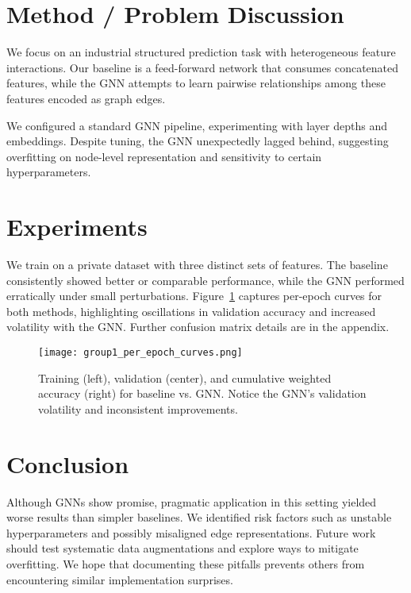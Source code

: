 \documentclass[11pt]{article}
\begin{document}
\section{Method / Problem Discussion}
We focus on an industrial structured prediction task with heterogeneous feature interactions. Our baseline is a feed-forward network that consumes concatenated features, while the GNN attempts to learn pairwise relationships among these features encoded as graph edges.

We configured a standard GNN pipeline, experimenting with layer depths and embeddings. Despite tuning, the GNN unexpectedly lagged behind, suggesting overfitting on node-level representation and sensitivity to certain hyperparameters.

\section{Experiments}
We train on a private dataset with three distinct sets of features. The baseline consistently showed better or comparable performance, while the GNN performed erratically under small perturbations. Figure~\ref{fig:group1} captures per-epoch curves for both methods, highlighting oscillations in validation accuracy and increased volatility with the GNN. Further confusion matrix details are in the appendix.

\begin{figure}[t]
    \centering
    \texttt{[image: group1\_per\_epoch\_curves.png]}
    \caption{Training (left), validation (center), and cumulative weighted accuracy (right) for baseline vs. GNN. Notice the GNN's validation volatility and inconsistent improvements.}
    \label{fig:group1}
\end{figure}

\section{Conclusion}
Although GNNs show promise, pragmatic application in this setting yielded worse results than simpler baselines. We identified risk factors such as unstable hyperparameters and possibly misaligned edge representations. Future work should test systematic data augmentations and explore ways to mitigate overfitting. We hope that documenting these pitfalls prevents others from encountering similar implementation surprises.



\end{document}
